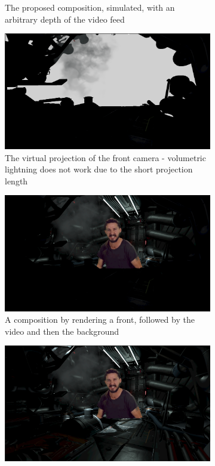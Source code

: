 \begin{figure}[htbp]
\begin{subfigure}[t]{.45\textwidth}
		\caption{The proposed composition, simulated, with an arbitrary depth 
			of the video feed}
	\end{subfigure}
	\begin{subfigure}[t]{.45\textwidth}
		\centering
		\includegraphics[width=\textwidth]{gfx/composition/Composition-Front.png}
		\caption{The virtual projection of the front camera - volumetric 
			lightning does not work due to the short projection length}
		\end{subfigure}
	\begin{subfigure}[t]{.45\textwidth}
		\centering
		\includegraphics[width=\textwidth]{gfx/composition/Composition-Front-Replace_orso.png}
		\caption{A composition by rendering a front, followed by the video and 
		then the background}
	\end{subfigure}
	\begin{subfigure}[t]{.45\textwidth}
		\centering
		\includegraphics[width=\textwidth]{gfx/composition/Composition-Front-Mask.png}

\end{subfigure}
\end{figure}
